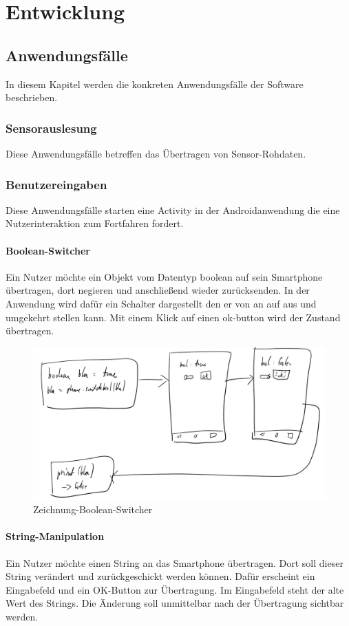 \documentclass[11pt,a4paper]{report}
\begin{document}
\chapter{Entwicklung} \label{chap:Entwicklung}
\section*{Anwendungsfälle}
In diesem Kapitel werden die konkreten Anwendungsfälle der Software beschrieben.
\subsection*{Sensorauslesung}
Diese Anwendungsfälle betreffen das Übertragen von Sensor-Rohdaten.

\subsection*{Benutzereingaben}
Diese Anwendungsfälle starten eine Activity in der Androidanwendung die eine Nutzerinteraktion zum Fortfahren fordert.
\subsubsection*{Boolean-Switcher}
Ein Nutzer möchte ein Objekt vom Datentyp boolean auf sein Smartphone übertragen, dort negieren und anschließend wieder zurücksenden.
In der Anwendung wird dafür ein Schalter dargestellt den er von an auf aus und umgekehrt stellen kann.
Mit einem Klick auf einen ok-button wird der Zustand übertragen.
\begin{figure}[htbp]
  \centering
  \includegraphics[width=.9\textwidth]{images/bool_switch.png}
  \caption{Zeichnung-Boolean-Switcher}
  \label{fig:bool_switch}
\end{figure}

\subsubsection*{String-Manipulation}
Ein Nutzer möchte einen String an das Smartphone übertragen.
Dort soll dieser String verändert und zurückgeschickt werden können.
Dafür erscheint ein Eingabefeld und ein OK-Button zur Übertragung.
Im Eingabefeld steht der alte Wert des Strings.
Die Änderung soll unmittelbar nach der Übertragung sichtbar werden.
\end{document}
